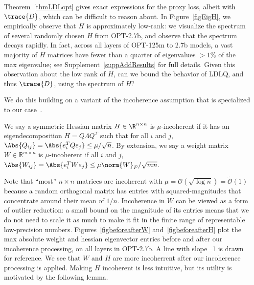 Theorem~\ref{thmLDLopt} gives exact expressions for the proxy loss, albeit with $\trace{D}$, which can be difficult to reason about.
In Figure~\ref{figEigH}, we
empirically observe that $H$ is approximately low-rank: we visualize the spectrum of several randomly chosen $H$ from OPT-2.7b, and observe that the spectrum decays rapidly.
In fact, across all layers of OPT-125m to 2.7b models, a vast majority of $H$ matrices have fewer than a quarter of eigenvalues $>1\%$ of the max eigenvalue; see Supplement~\ref{suppAddResults} for full details.
Given this observation about the low rank of $H$, can we bound the behavior of LDLQ, and thus $\trace{D}$, using the spectrum of $H$?

We do this building on a variant of the incoherence assumption that is specialized to our case~\cite{desa2015matrix, jain2013complete}.
\begin{definitionrep}
We say a symmetric Hessian matrix $H \in \R^{n \times n}$ is $\mu$-incoherent if it has an eigendecomposition $H = Q \Lambda Q^T$ such that for all $i$ and $j$,
$\Abs{ Q_{ij} } = \Abs{ e_i^T Q e_j } \le \mu / \sqrt{n}$. By extension, we say a weight matrix $W \in \mathbb{R}^{m \times n}$ is $\mu$-incoherent if all $i$ and $j$,
$\Abs{ W_{ij} } = \Abs{ e_i^T W e_j } \le \mu \norm{W}_F / \sqrt{mn}$.
\end{definitionrep}%
Note that ``most'' $n \times n$ matrices are incoherent with $\mu = \mathcal{O}(\sqrt{\log n}) = \tilde{\mathcal{O}}(1)$ because a random orthogonal matrix has entries with squared-magnitudes that concentrate around their mean of $1/n$.
Incoherence in $W$ can be viewed as a form of outlier reduction: a small bound on the magnitude of its entries means that we do not need to scale it as much to make it fit in the finite range of representable low-precision numbers.
Figures~\ref{figbeforeafterW} and~\ref{figbeforeafterH} plot the max absolute weight and hessian eigenvector entries before and after our incoherence processing, on all layers in OPT-2.7b.
A line with slope=1 is drawn for reference.
We see that $W$ and $H$ are more incoherrent after our incoherence processing is applied.
Making $H$ incoherent is less intuitive, but its utility is motivated by the following lemma.

